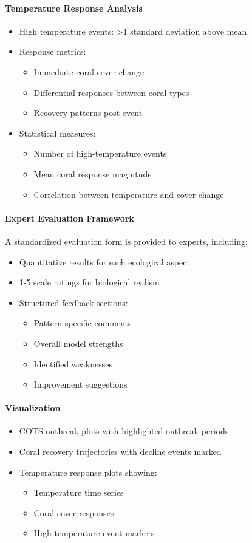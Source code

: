 \paragraph{Temperature Response Analysis}
\begin{itemize}
\item High temperature events: >1 standard deviation above mean
\item Response metrics:
  \begin{itemize}
  \item Immediate coral cover change
  \item Differential responses between coral types
  \item Recovery patterns post-event
  \end{itemize}
\item Statistical measures:
  \begin{itemize}
  \item Number of high-temperature events
  \item Mean coral response magnitude
  \item Correlation between temperature and cover change
  \end{itemize}
\end{itemize}

\paragraph{Expert Evaluation Framework}
A standardized evaluation form is provided to experts, including:
\begin{itemize}
\item Quantitative results for each ecological aspect
\item 1-5 scale ratings for biological realism
\item Structured feedback sections:
  \begin{itemize}
  \item Pattern-specific comments
  \item Overall model strengths
  \item Identified weaknesses
  \item Improvement suggestions
  \end{itemize}
\end{itemize}

\paragraph{Visualization}
\begin{itemize}
\item COTS outbreak plots with highlighted outbreak periods
\item Coral recovery trajectories with decline events marked
\item Temperature response plots showing:
  \begin{itemize}
  \item Temperature time series
  \item Coral cover responses
  \item High-temperature event markers
  \end{itemize}
\end{itemize}

